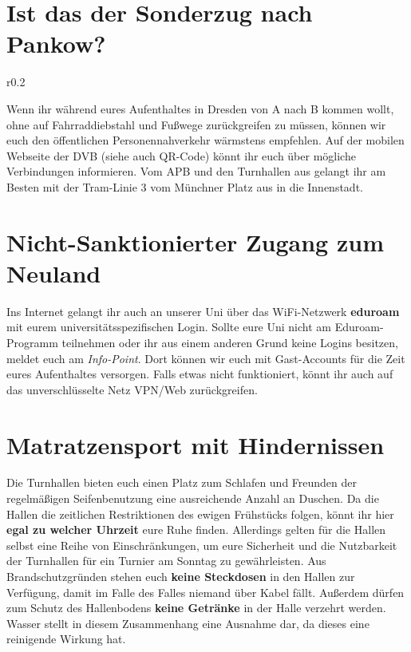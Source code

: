 \section*{Ist das der Sonderzug nach Pankow?}

\begin{wrapfigure}[6]{r}{0.2\textwidth}
  \vspace*{-11pt}
  \textcolor{KIFgrey}{}
\end{wrapfigure}

Wenn ihr während eures Aufenthaltes in Dresden von A nach B kommen wollt, ohne auf Fahrraddiebstahl und Fußwege zurückgreifen zu müssen, können wir euch den öffentlichen Personennahverkehr wärmstens empfehlen.
Auf der mobilen Webseite der DVB  (siehe auch QR-Code) könnt ihr euch über mögliche Verbindungen informieren.
Vom APB und den Turnhallen aus gelangt ihr am Besten mit der Tram-Linie 3 vom Münchner Platz aus in die Innenstadt.

\section*{Nicht-Sanktionierter Zugang zum Neuland}

Ins Internet gelangt ihr auch an unserer Uni über das WiFi-Netzwerk \textbf{eduroam} mit eurem universitätsspezifischen Login.
Sollte eure Uni nicht am Eduroam-Programm teilnehmen oder ihr aus einem anderen Grund keine Logins besitzen, meldet euch am \emph{Info-Point}.
Dort können wir euch mit Gast-Accounts für die Zeit eures Aufenthaltes versorgen.
Falls etwas nicht funktioniert, könnt ihr auch auf das unverschlüsselte Netz VPN/Web zurückgreifen.

\section*{Matratzensport mit Hindernissen}

Die Turnhallen bieten euch einen Platz zum Schlafen und Freunden der regelmäßigen Seifenbenutzung eine ausreichende Anzahl an Duschen.
Da die Hallen die zeitlichen Restriktionen des ewigen Frühstücks folgen, könnt ihr hier \textbf{egal zu welcher Uhrzeit} eure Ruhe finden.
Allerdings gelten für die Hallen selbst eine Reihe von Einschränkungen, um eure Sicherheit und die Nutzbarkeit der Turnhallen für ein Turnier am Sonntag zu gewährleisten.
Aus Brandschutzgründen stehen euch \textbf{keine Steckdosen} in den Hallen zur Verfügung, damit im Falle des Falles niemand über Kabel fällt.
Außerdem dürfen zum Schutz des Hallenbodens \textbf{keine Getränke} in der Halle verzehrt werden.
Wasser stellt in diesem Zusammenhang eine Ausnahme dar, da dieses eine reinigende Wirkung hat.

